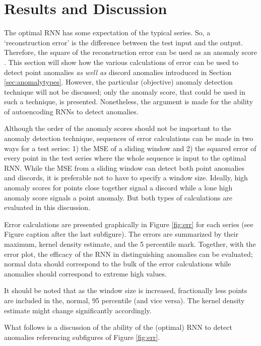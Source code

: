 \section{Results and Discussion}
\label{sec:results}

The optimal RNN has some expectation of the typical series.
%
So, a `reconstruction error' is the difference between the test input and the output.
%
Therefore, the square of the reconstruction error can be used as an anomaly score \cite{Erfani2014}.
%
This section will show how the various calculations of error can be used to detect point anomalies \emph{as well as} discord anomalies introduced in Section \ref{sec:anomalytypes}.
%
However, the particular (objective) anomaly detection technique will not be discussed;
only the anomaly score, that could be used in such a technique, is presented.
%
Nonetheless, the argument is made for the ability of autoencoding RNNs to detect anomalies.


Although the order of the anomaly scores should not be important to the anomaly detection technique, sequences of error calculations can be made in two ways for a test series: 1) the MSE of a sliding window and 2) the squared error of every point in the test series where the whole sequence is input to the optimal RNN.
%
While the MSE from a sliding window can detect both point anomalies and discords, it is preferable not to have to specify a window size.
%
Ideally, high anomaly scores for points close together signal a discord while a lone high anomaly score signals a point anomaly.
%
But both types of calculations are evaluated in this discussion.


Error calculations are presented graphically in Figure \ref{fig:err} for each series (see Figure caption after the last subfigure).
%
The errors are summarized by their maximum, kernel density estimate, and the 5 percentile mark.
%
Together, with the error plot, the efficacy of the RNN in distinguishing anomalies can be evaluated;
%
normal data should correspond to the bulk of the error calculations while anomalies should correspond to extreme high values.


It should be noted that as the window size is increased, fractionally less points are included in the, normal, 95 percentile (and vice versa).
%
The kernel density estimate might change significantly accordingly.


What follows is a discussion of the ability of the (optimal) RNN to detect anomalies referencing subfigures of Figure \ref{fig:err}.


